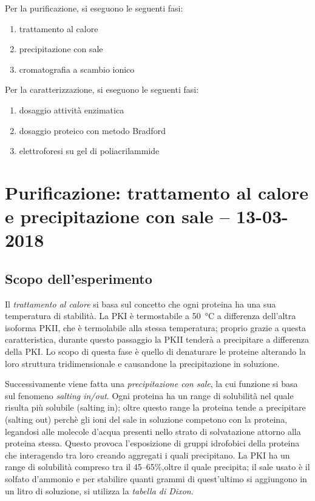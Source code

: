 \documentclass[twocolumn,a4paper,10pt]{my_report}
\begin{document}
{Per la purificazione, si eseguono le seguenti fasi:

\begin{enumerate}
	\item trattamento al calore
	\item precipitazione con sale
	\item cromatografia a scambio ionico
\end{enumerate}

Per la caratterizzazione, si eseguono le seguenti fasi:

\begin{enumerate}
    \item dosaggio attività enzimatica
	\item dosaggio proteico con metodo Bradford
	\item elettroforesi su gel di poliacrilammide
\end{enumerate}

\section{Purificazione: trattamento al calore e precipitazione con sale -- 13-03-2018}
\subsection{Scopo dell'esperimento}
Il \emph{trattamento al calore} si basa sul concetto che ogni proteina ha una sua temperatura di stabilità. La PKI è termostabile a \SI{50}{\celsius} a differenza dell'altra isoforma PKII, che è termolabile alla stessa temperatura; proprio grazie a questa caratteristica, durante questo passaggio la PKII tenderà a precipitare a differenza della PKI.
Lo scopo di questa fase è quello di denaturare le proteine alterando la loro struttura tridimensionale e causandone la precipitazione in soluzione.

Successivamente viene fatta una \emph{precipitazione con sale}, la cui funzione si basa sul fenomeno \emph{salting in/out}.
Ogni proteina ha un range di solubilità nel quale risulta più solubile (salting in); oltre questo range la proteina tende a precipitare (salting out) perchè gli ioni del sale in soluzione competono con la proteina, legandosi alle molecole d'acqua presenti nello strato di solvatazione attorno alla proteina stessa. Questo provoca l'esposizione di gruppi idrofobici della proteina che interagendo tra loro creando aggregati i quali precipitano.
La PKI ha un range di solubilità compreso tra il 45--65\%,oltre il quale precipita; il sale usato è il solfato d'ammonio  e per stabilire quanti grammi di quest'ultimo si aggiungono in un litro di soluzione, si utilizza la \emph{tabella di Dixon}.

}
\end{document}
